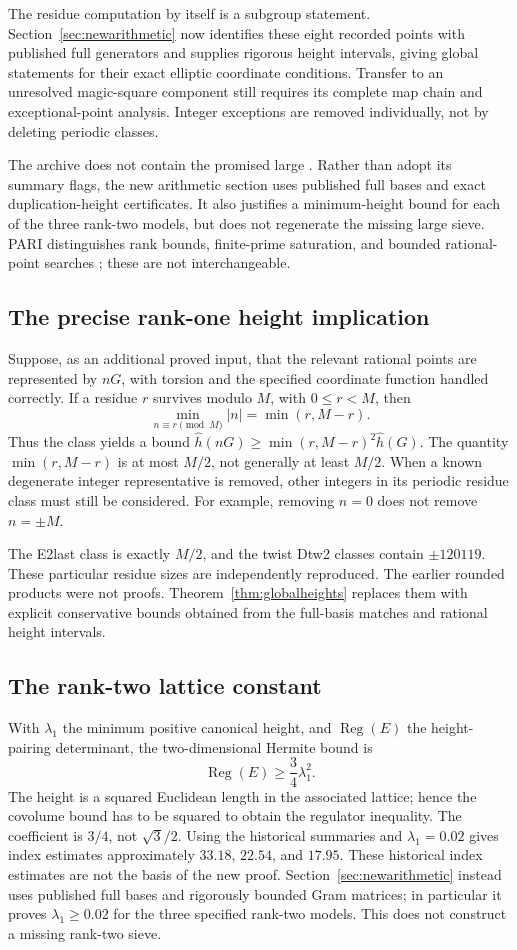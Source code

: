 \documentclass[11pt,letterpaper]{article}
\theoremstyle{definition}\newtheorem{definition}[theorem]{Definition}
\theoremstyle{remark}\newtheorem{remark}[theorem]{Remark}
\begin{document}
The residue computation by itself is a subgroup statement. Section~\ref{sec:newarithmetic} now identifies these eight recorded points with published full generators and supplies rigorous height intervals, giving global statements for their exact elliptic coordinate conditions. Transfer to an unresolved magic-square component still requires its complete map chain and exceptional-point analysis. Integer exceptions are removed individually, not by deleting periodic classes.

The archive does not contain the promised large . Rather than adopt its summary flags, the new arithmetic section uses published full bases and exact duplication-height certificates. It also justifies a minimum-height bound for each of the three rank-two models, but does not regenerate the missing large sieve. PARI distinguishes rank bounds, finite-prime saturation, and bounded rational-point searches \cite{PARI}; these are not interchangeable.

\subsection{The precise rank-one height implication}
Suppose, as an additional proved input, that the relevant rational points are represented by $nG$, with torsion and the specified coordinate function handled correctly. If a residue $r$ survives modulo $M$, with $0\le r<M$, then
\[
\min_{n\equiv r\pmod M}|n|=\min(r,M-r).
\]
Thus the class yields a bound $\widehat h(nG)\ge \min(r,M-r)^2\widehat h(G)$. The quantity $\min(r,M-r)$ is at most $M/2$, not generally at least $M/2$. When a known degenerate integer representative is removed, other integers in its periodic residue class must still be considered. For example, removing $n=0$ does not remove $n=\pm M$.

The E2last class is exactly $M/2$, and the twist Dtw2 classes contain $\pm120119$. These particular residue sizes are independently reproduced. The earlier rounded products were not proofs. Theorem~\ref{thm:globalheights} replaces them with explicit conservative bounds obtained from the full-basis matches and rational height intervals.

\subsection{The rank-two lattice constant}
With $\lambda_1$ the minimum positive canonical height, and $\operatorname{Reg}(E)$ the height-pairing determinant, the two-dimensional Hermite bound is
\[
\operatorname{Reg}(E)\ge\frac34\lambda_1^2.
\]
The height is a squared Euclidean length in the associated lattice; hence the covolume bound has to be squared to obtain the regulator inequality. The coefficient is $3/4$, not $\sqrt3/2$. Using the historical summaries and $\lambda_1=0.02$ gives index estimates approximately $33.18$, $22.54$, and $17.95$. These historical index estimates are not the basis of the new proof. Section~\ref{sec:newarithmetic} instead uses published full bases and rigorously bounded Gram matrices; in particular it proves $\lambda_1\ge0.02$ for the three specified rank-two models. This does not construct a missing rank-two sieve.
\end{document}
